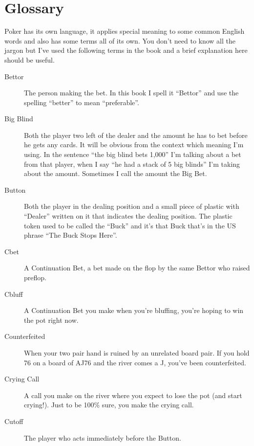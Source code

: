 \chapter{Glossary}


Poker has its own language, it applies special meaning to some
common English words and also has some terms all of its own. You
don't need to know all the jargon but I've used the following terms
in the book and a brief explanation here should be useful.

\begin{description}

\item[Bettor] The person making the bet. In this book I spell it ``Bettor''
and use the spelling ``better'' to mean ``preferable''. 

\item[Big Blind] Both the player two left of the dealer and the amount 
he has to bet before he gets any cards. It will be obvious from the context which
meaning I'm using. In the sentence ``the big blind bets 1,000'' I'm talking about a bet
from that player, when I say ``he had a stack of 5 big blinds'' I'm taking about the
amount. Sometimes I call the amount the Big Bet.

\item[Button] Both the player in the dealing position and a small piece
of plastic with ``Dealer'' written on it that indicates the dealing position.
The plastic token used to be called the ``Buck'' and it's that Buck that's in the
US phrase ``The Buck Stops Here''.

\item[Cbet] A Continuation Bet, a bet made on the flop by the same Bettor
who raised preflop.

\item[Cbluff] A Continuation Bet you make when you're bluffing, you're hoping
to win the pot right now.

\item[Counterfeited] When your two pair hand is ruined by an unrelated board pair.
If you hold 76 on a board of AJ76 and the river comes a J,
you've been counterfeited.

\item[Crying Call] A call you make on the river where you expect to lose the pot
(and start crying!). Just to be 100\% sure, you make the crying call.

\item[Cutoff] The player who acts immediately before the Button.


\end{description}
